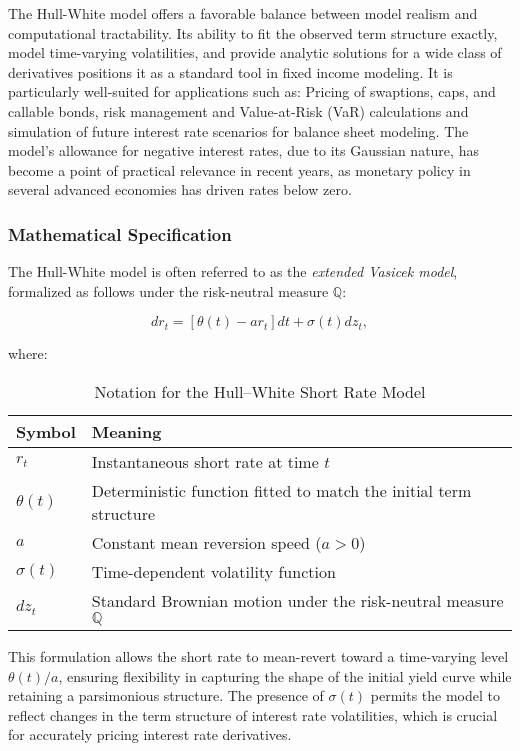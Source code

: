 The Hull-White model offers a favorable balance between model realism and computational tractability. Its ability to fit the observed term structure exactly, model time-varying volatilities, and provide analytic solutions for a wide class of derivatives positions it as a standard tool in fixed income modeling. It is particularly well-suited for applications such as: Pricing of swaptions, caps, and callable bonds, risk management and Value-at-Risk (VaR) calculations and simulation of future interest rate scenarios for balance sheet modeling. The model’s allowance for negative interest rates, due to its Gaussian nature, has become a point of practical relevance in recent years, as monetary policy in several advanced economies has driven rates below zero.

\subsubsection{Mathematical Specification}
The Hull-White model is often referred to as the \textit{extended Vasicek model}, formalized as follows under the risk-neutral measure \( \mathbb{Q} \):

\begin{equation}
	dr_t = \left[ \theta(t) - a r_t \right] dt + \sigma(t) dz_t,
\end{equation}

where:
\begin{table}[H]
	\centering
	\caption{Notation for the Hull--White Short Rate Model}
	\begin{tabular}{ll}
		\toprule
		\textbf{Symbol} & \textbf{Meaning}                                                     \\
		\midrule
		$r_t$           & Instantaneous short rate at time $t$                                 \\
		$\theta(t)$     & Deterministic function fitted to match the initial term structure    \\
		$a$             & Constant mean reversion speed ($a > 0$)                              \\
		$\sigma(t)$     & Time-dependent volatility function                                   \\
		$dz_t$          & Standard Brownian motion under the risk-neutral measure $\mathbb{Q}$ \\
		\bottomrule
	\end{tabular}
\end{table}

This formulation allows the short rate to mean-revert toward a time-varying level \( \theta(t)/a \), ensuring flexibility in capturing the shape of the initial yield curve while retaining a parsimonious structure. The presence of \( \sigma(t) \) permits the model to reflect changes in the term structure of interest rate volatilities, which is crucial for accurately pricing interest rate derivatives.

